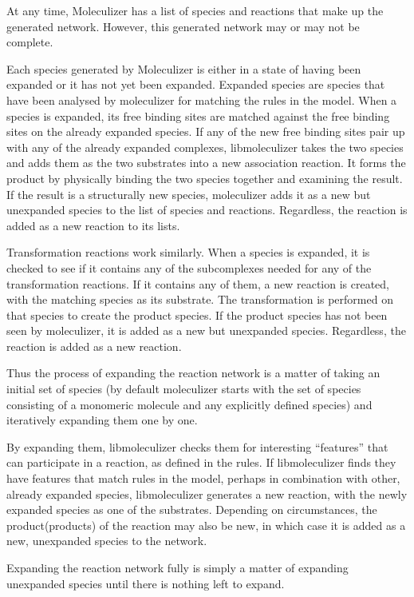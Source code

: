 At any time, Moleculizer has a list of species and reactions that make
up the generated network.  However, this generated network may or may
not be complete.   

Each species generated by Moleculizer is either in a state of having
been expanded or it has not yet been expanded.  Expanded species are
species that have been analysed by moleculizer for matching the rules
in the model.  When a species is expanded, its free binding sites are
matched against the free binding sites on the already expanded
species.  If any of the new free binding sites pair up with any of the
already expanded complexes, libmoleculizer takes the two species and
adds them as the two substrates into a new association reaction.  It
forms the product by physically binding the two species together and
examining the result.  If the result is a structurally new species,
moleculizer adds it as a new but unexpanded species to the list of
species and reactions.  Regardless, the reaction is added as a new
reaction to its lists.  

Transformation reactions work similarly.  When a species is expanded,
it is checked to see if it contains any of the subcomplexes needed for
any of the transformation reactions.  If it contains any of them, a
new reaction is created, with the matching species as its substrate.
The transformation is performed on that species to create the product
species.  If the product species has not been seen by moleculizer, it
is added as a new but unexpanded species.  Regardless, the reaction is
added as a new reaction.  

Thus the process of expanding the reaction network is a matter of
taking an initial set of species (by default moleculizer starts with
the set of species consisting of a monomeric molecule and any
explicitly defined species)  and iteratively expanding them one by
one.  

By expanding them, libmoleculizer checks them for interesting
``features'' that can participate in a reaction, as defined in the
rules.  If libmoleculizer finds they have features that match rules in
the model, perhaps in combination with other, already expanded
species, libmoleculizer generates a new reaction, with the newly
expanded species as one of the substrates.  Depending on
circumstances, the product(products) of the reaction may also be new, in 
which case it is added as a new, unexpanded species to the network.  

Expanding the reaction network fully is simply a matter of expanding
unexpanded species until there is nothing left to expand.  

